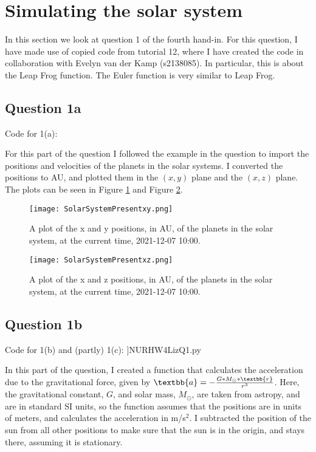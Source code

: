 \section{Simulating the solar system}

In this section we look at question 1 of the fourth hand-in. 
For this question, I have made use of copied code from tutorial 12, where I have created the code in collaboration with Evelyn van der Kamp (s2138085). 
In particular, this is about the Leap Frog function. The Euler function is very similar to Leap Frog.

\subsection{Question 1a}

Code for 1(a):


For this part of the question I followed the example in the question to import the positions and velocities of the planets in the solar systems.
I converted the positions to AU, and plotted them in the $(x,y)$ plane and the $(x,z)$ plane.
The plots can be seen in Figure \ref{fig:SSxy} and Figure \ref{fig:SSxz}.

\begin{figure}[ht!]
  \centering
  \texttt{[image: SolarSystemPresentxy.png]}
  \caption{A plot of the x and y positions, in AU, of the planets in the solar system, at the current time, 2021-12-07 10:00.}
  \label{fig:SSxy}
\end{figure}

\begin{figure}[ht!]
  \centering
  \texttt{[image: SolarSystemPresentxz.png]}
  \caption{A plot of the x and z positions, in AU, of the planets in the solar system, at the current time, 2021-12-07 10:00.}
  \label{fig:SSxz}
\end{figure}

\subsection{Question 1b}

Code for 1(b) and (partly) 1(c):
]{NURHW4LizQ1.py}

In this part of the question, I created a function that calculates the acceleration due to the gravitational force, given by $\textbb{a} = -\frac{G*M_{\odot}*\textbb{r}}{r^3}$.
Here, the gravitational constant, $G$, and solar mass, $M_{\odot}$, are taken from astropy, and are in standard SI units, so the function assumes that the positions are in units of meters, and calculates the acceleration in m/s$^2$.
I subtracted the position of the sun from all other positions to make sure that the sun is in the origin, and stays there, assuming it is stationary.

